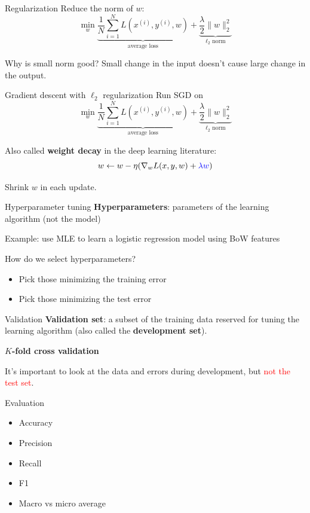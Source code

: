\documentclass[usenames,dvipsnames,notes]{beamer}
\begin{document}
\begin{frame}
    {Regularization}
    Reduce the norm of $w$:
    $$
    \min_w \underbrace{\frac{1}{N}\sum_{i=1}^N L(x^{(i)}, y^{(i)}, w)}_{\text{average loss}}
    + \underbrace{\frac{\lambda}{2}\|w\|_2^2}_{\ell_2 \text{ norm}}
    $$

    Why is small norm good? Small change in the input doesn't cause large change in the output.
    \vspace{7em}
\end{frame}

\begin{frame}
    {Gradient descent with $\ell_2$ regularization}
    Run SGD on 
    $$
    \min_w \underbrace{\frac{1}{N}\sum_{i=1}^N L(x^{(i)}, y^{(i)}, w)}_{\text{average loss}}
    + \underbrace{\frac{\lambda}{2}\|w\|_2^2}_{\ell_2 \text{ norm}}
    $$

    Also called \textbf{weight decay} in the deep learning literature:
    $$
    w \leftarrow w - \eta(\nabla_w L(x, y, w) + {\color{blue}\lambda w})
    $$

    Shrink $w$ in each update.
\end{frame}

\begin{frame}
    {Hyperparameter tuning}
    \textbf{Hyperparameters}: parameters of the learning algorithm (not the model)

    Example: use MLE to learn a logistic regression model using BoW features \\
    \vspace{7em} 

    \pause
    How do we select hyperparameters?\\
    \begin{itemize}
        \item[] Pick those minimizing the training error 
        \item[] Pick those minimizing the test error 
    \end{itemize}
\end{frame}

\begin{frame}
    {Validation}
    \textbf{Validation set}: a subset of the training data reserved for tuning the learning algorithm (also called the \textbf{development set}).

    \textbf{$K$-fold cross validation}\\
    \vspace{10em}

    It's important to look at the data and errors during development, but \textcolor{red}{not the test set}.
\end{frame}

\begin{frame}
    {Evaluation}
    \begin{itemize}
        \itemsep3em
        \item Accuracy
        \item Precision
        \item Recall 
        \item F1
        \item Macro vs micro average
    \end{itemize}
\end{frame}
\end{document}
